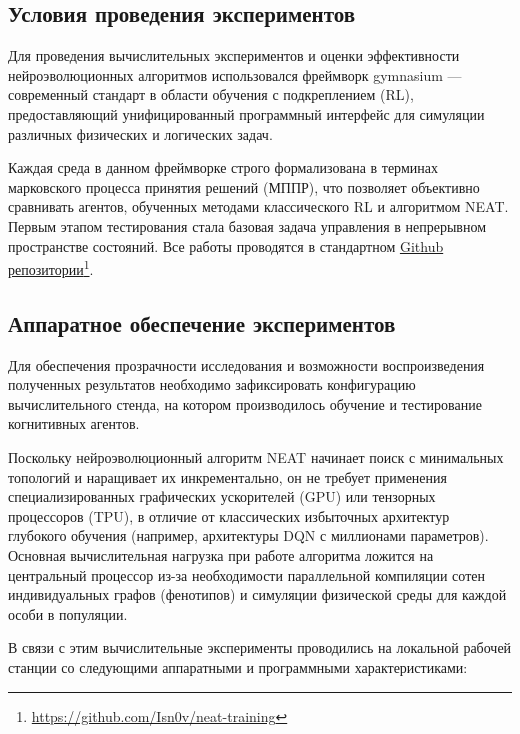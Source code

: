 \subsection{Условия проведения экспериментов}

Для проведения вычислительных экспериментов и оценки эффективности нейроэволюционных алгоритмов использовался фреймворк gymnasium  — современный стандарт в области обучения с подкреплением (RL), предоставляющий унифицированный программный интерфейс для симуляции различных физических и логических задач.

Каждая среда в данном фреймворке строго формализована в терминах марковского процесса принятия решений (МППР), что позволяет объективно сравнивать агентов, обученных методами классического RL и алгоритмом NEAT. Первым этапом тестирования стала базовая задача управления в непрерывном пространстве состояний. Все работы проводятся в стандартном \href{https://github.com/Isn0v/neat-training}{Github репозитории}\footnote{\url{https://github.com/Isn0v/neat-training}}.

\subsection{Аппаратное обеспечение экспериментов}

Для обеспечения прозрачности исследования и возможности воспроизведения полученных результатов необходимо зафиксировать конфигурацию вычислительного стенда, на котором производилось обучение и тестирование когнитивных агентов.

Поскольку нейроэволюционный алгоритм NEAT начинает поиск с минимальных топологий и наращивает их инкрементально, он не требует применения специализированных графических ускорителей (GPU) или тензорных процессоров (TPU), в отличие от классических избыточных архитектур глубокого обучения (например, архитектуры DQN с миллионами параметров). Основная вычислительная нагрузка при работе алгоритма ложится на центральный процессор из-за необходимости параллельной компиляции сотен индивидуальных графов (фенотипов) и симуляции физической среды для каждой особи в популяции.

В связи с этим вычислительные эксперименты проводились на локальной рабочей станции со следующими аппаратными и программными характеристиками:


